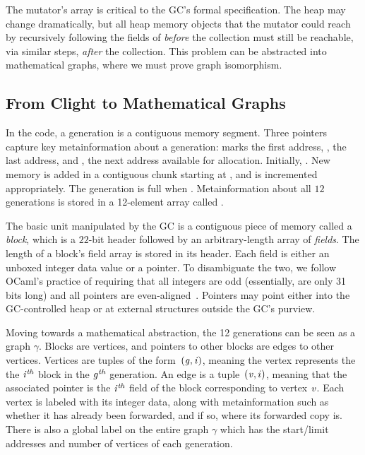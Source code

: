 The mutator's  array is critical to the GC's formal specification.
The heap may change dramatically, but all heap memory objects 
that the mutator could reach by recursively
following the fields of  \emph{before} the collection 
must still be reachable, via similar steps, \emph{after} the collection.  This problem can be abstracted 
into mathematical graphs, where we must prove graph isomorphism.

\subsection{From Clight to Mathematical Graphs}
\label{sec:movetomathgraph}
In the code, a generation is a contiguous memory segment. 
Three pointers capture key metainformation about a generation:
 marks the first address, ,
the last address, and , the next address available for 
allocation.  
Initially, . 
New memory is added in a contiguous chunk starting 
at , and  is
incremented appropriately. 
The generation is full when .
Metainformation about all $12$ generations is stored in 
a 12-element array called .
	
The basic unit manipulated by the GC is a
contiguous piece of memory called a \emph{block}, which is a 
$22$-bit header followed by an arbitrary-length array of \emph{fields}.
The length of a block's field array is stored in its header.
Each field is either an unboxed integer data value or a pointer. 
To disambiguate the two,
we follow OCaml's practice of requiring that all integers are odd 
(essentially, are only 31 bits long) and all pointers are even-aligned~\cite{realworldocaml}. Pointers may point either into the GC-controlled heap or at external structures outside the GC's purview.

Moving towards a mathematical abstraction, the 12 generations can be seen
as a graph $\gamma$. Blocks are
vertices, and pointers to other blocks are edges to other
vertices. 
Vertices are tuples of the form~$(\mathit{g}, \mathit{i})$, meaning the vertex represents the 
the $\mathit{i}^{\textit{th}}$ block in the $\mathit{g}^{\textit{th}}$ generation. 
An edge is a tuple~$(\mathit{v}, i)$, meaning that 
the associated pointer is the $\mathit{i}^{\textit{th}}$ field of the block
corresponding to vertex $\mathit{v}$. 
Each vertex is labeled with its integer data, along with 
metainformation such as whether it has already been forwarded, 
and if so, where its forwarded copy is.
There is also a global label on the entire graph $\gamma$ which has the
start/limit addresses and number of vertices of each generation. 

